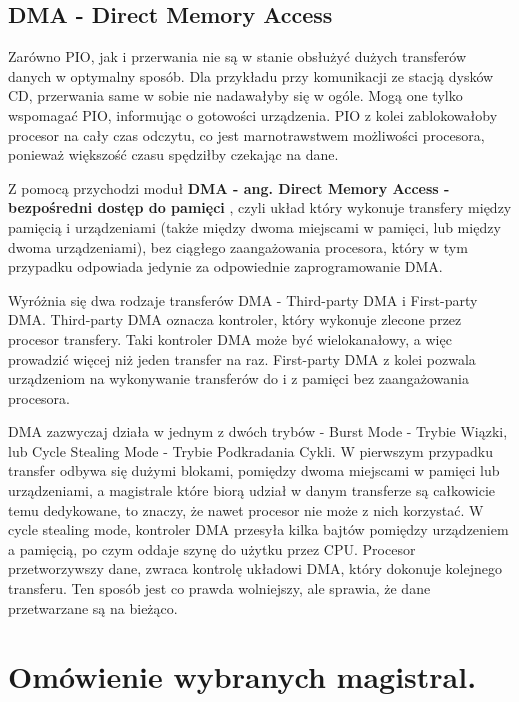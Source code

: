 \documentclass[shortabstract,inz]{iithesis}
\begin{document}
 
\section{DMA - Direct Memory Access} %
\label{sec:dma}

Zarówno PIO, jak i przerwania nie są w stanie obsłużyć dużych transferów danych 
w optymalny sposób. Dla przykładu przy komunikacji ze stacją dysków CD, przerwania
same w sobie nie nadawałyby się w ogóle. Mogą one tylko wspomagać PIO, informując 
o gotowości urządzenia. PIO z kolei zablokowałoby procesor na cały czas odczytu, 
co jest marnotrawstwem możliwości procesora, ponieważ większość czasu spędziłby czekając
na dane. 


Z pomocą przychodzi moduł \textbf{DMA - ang. Direct Memory Access - bezpośredni dostęp do pamięci} \cite{def:wiki_dma}, 
czyli układ który wykonuje transfery między 
pamięcią i urządzeniami (także między dwoma miejscami w pamięci, lub między dwoma urządzeniami), bez 
ciągłego zaangażowania procesora, który w tym  przypadku odpowiada jedynie za odpowiednie zaprogramowanie DMA. 

Wyróżnia się dwa rodzaje transferów DMA - Third-party DMA i First-party DMA. 
Third-party DMA oznacza kontroler, który wykonuje zlecone przez procesor transfery. 
Taki kontroler DMA może być wielokanałowy, a więc prowadzić więcej niż jeden transfer na raz. 
First-party DMA z kolei pozwala urządzeniom na wykonywanie transferów do i z pamięci bez 
zaangażowania procesora. 


DMA zazwyczaj działa w jednym z dwóch trybów - Burst Mode - Trybie Wiązki, lub 
Cycle Stealing Mode - Trybie Podkradania Cykli. W pierwszym przypadku transfer odbywa się 
dużymi blokami, pomiędzy dwoma miejscami w pamięci lub urządzeniami, a magistrale 
które biorą udział w danym transferze są całkowicie temu dedykowane, to znaczy, 
że nawet procesor nie może z nich korzystać. W cycle stealing mode, kontroler DMA przesyła kilka 
bajtów pomiędzy urządzeniem a pamięcią, po czym oddaje szynę do użytku przez CPU. 
Procesor przetworzywszy dane, zwraca kontrolę układowi DMA, który dokonuje 
kolejnego transferu. Ten sposób jest co prawda wolniejszy, ale sprawia, że dane przetwarzane są na bieżąco.


\chapter{Omówienie wybranych magistral.}
\end{document}
